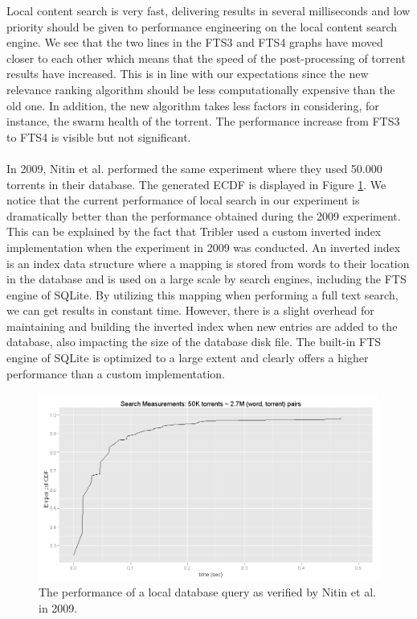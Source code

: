 Local content search is very fast, delivering results in several milliseconds and low priority should be given to performance engineering on the local content search engine. We see that the two lines in the FTS3 and FTS4 graphs have moved closer to each other which means that the speed of the post-processing of torrent results have increased. This is in line with our expectations since the new relevance ranking algorithm should be less computationally expensive than the old one. In addition, the new algorithm takes less factors in considering, for instance, the swarm health of the torrent. The performance increase from FTS3 to FTS4 is visible but not significant.\\\\
In 2009, Nitin et al. performed the same experiment where they used 50.000 torrents in their database. The generated ECDF is displayed in Figure \ref{fig:local-search-nitin}. We notice that the current performance of local search in our experiment is dramatically better than the performance obtained during the 2009 experiment. This can be explained by the fact that Tribler used a custom inverted index implementation when the experiment in 2009 was conducted. An inverted index is an index data structure where a mapping is stored from words to their location in the database and is used on a large scale by search engines, including the FTS engine of SQLite. By utilizing this mapping when performing a full text search, we can get results in constant time. However, there is a slight overhead for maintaining and building the inverted index when new entries are added to the database, also impacting the size of the database disk file. The built-in FTS engine of SQLite is optimized to a large extent and clearly offers a higher performance than a custom implementation.

\begin{figure}[h!]
	\centering
	\includegraphics[width=1.0\columnwidth]{images/experiments/nitin_local_search}
	\caption{The performance of a local database query as verified by Nitin et al. in 2009.}
	\label{fig:local-search-nitin}
\end{figure}

